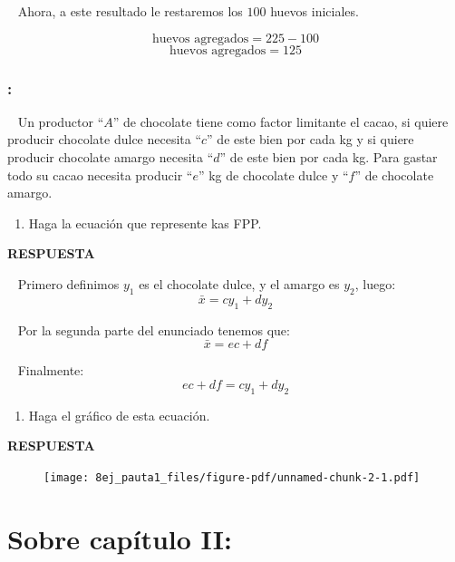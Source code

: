 \documentclass[
  letterpaper,
  DIV=11,
  numbers=noendperiod]{scrreport}
\providecommand{\tightlist}{%
  \setlength{\itemsep}{0pt}\setlength{\parskip}{0pt}}\usepackage{longtable,booktabs,array}
\begin{document}
~ Ahora, a este resultado le restaremos los \(100\) huevos iniciales.

\[
\text{huevos agregados}=225-100
\] \[
\text{huevos agregados}=125
\]

\hypertarget{section-24}{%
\subsection{:}\label{section-24}}

~ Un productor ``\(A\)'' de chocolate tiene como factor limitante el
cacao, si quiere producir chocolate dulce necesita ``\(c\)'' de este
bien por cada kg y si quiere producir chocolate amargo necesita
``\(d\)'' de este bien por cada kg. Para gastar todo su cacao necesita
producir ``\(e\)'' kg de chocolate dulce y ``\(f\)'' de chocolate
amargo.

\begin{enumerate}
\def\labelenumi{\arabic{enumi})}
\tightlist
\item
  Haga la ecuación que represente kas FPP.
\end{enumerate}

\textbf{RESPUESTA}

~ Primero definimos \(y_1\) es el chocolate dulce, y el amargo es
\(y_2\), luego: \[
\bar{x}=cy_1+dy_2
\]

~ Por la segunda parte del enunciado tenemos que: \[
\bar{x}=ec+df
\]

~ Finalmente: \[
ec+df=cy_1+dy_2
\]

\begin{enumerate}
\def\labelenumi{\arabic{enumi})}
\setcounter{enumi}{1}
\tightlist
\item
  Haga el gráfico de esta ecuación.
\end{enumerate}

\textbf{RESPUESTA}

\begin{figure}

{\centering \texttt{[image: 8ej\_pauta1\_files/figure-pdf/unnamed-chunk-2-1.pdf]}

}

\end{figure}


\hypertarget{sobre-capuxedtulo-ii-1}{%
\chapter{Sobre capítulo II:}\label{sobre-capuxedtulo-ii-1}}
\end{document}
